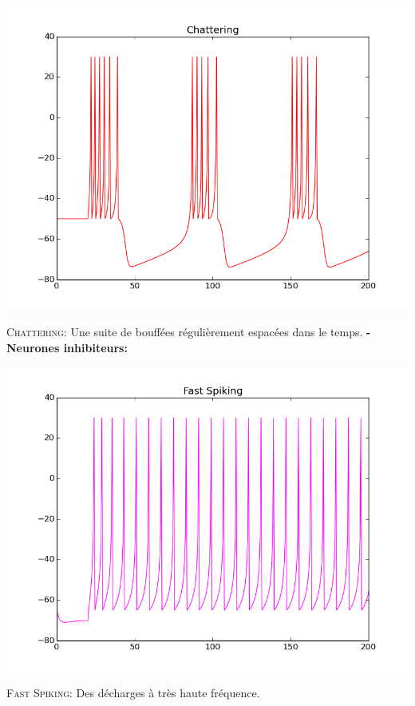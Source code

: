 \documentclass[10pt]{article}
\begin{document}
\begin{center}
\includegraphics[scale=0.5]{figure_3}
\end{center}
\justify
\textsc{Chattering:} Une suite de bouffées régulièrement espacées dans le temps.
\justify
\textbf{- Neurones inhibiteurs: }
\justify
\begin{center}
\includegraphics[scale=0.5]{figure_4}
\end{center}
\justify
\textsc{Fast Spiking:} Des décharges \`a très haute fréquence.
\end{document}
